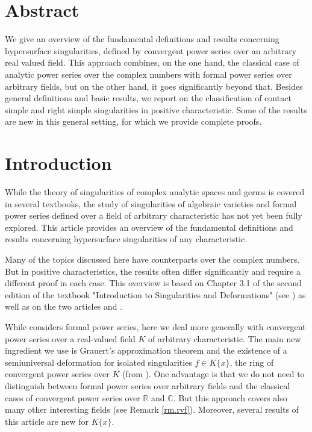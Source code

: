 \documentclass[11pt]{article}
\newcommand{\R}{{\mathbb R}}
\newcommand{\C}{{\mathbb C}}
\begin{document}
\maketitle

\section*{Abstract}
 {We give an overview of the fundamental definitions and results concerning hypersurface singularities, defined by convergent power series over an arbitrary real valued field. This approach combines, on the one hand, the classical case of analytic power series over the complex numbers with formal power series over arbitrary fields, but on the other hand, it goes significantly beyond that.  
Besides  general definitions and  basic results, we report on the classification of contact simple and right simple singularities in positive characteristic. 
Some of the results are new in this general setting, for which we provide complete proofs.}


\tableofcontents


\section*{Introduction}
While the theory of singularities of complex analytic spaces and germs  is covered in several textbooks, the study of singularities of algebraic varieties and formal power series defined over a field of arbitrary characteristic has not yet been fully explored. 
This article provides an overview of the fundamental definitions and results concerning hypersurface singularities of any characteristic.

Many of the topics discussed here have counterparts over the complex numbers. But in positive characteristics, the results often differ significantly and require a different proof in each case. This overview is based on Chapter 3.1 of the second edition of the textbook "Introduction to Singularities and Deformations" (see  \cite{GLS25}) as well as on the two articles \cite{GP25} and \cite{GP25a}.

 
While \cite{GLS25} considers formal power series, here we deal more generally with convergent power series over a real-valued field $K$ of arbitrary characteristic. The main new ingredient we use is Grauert's approximation theorem and the existence of a semiuniversal deformation for isolated singularities $f \in K\{x\}$, the ring of convergent power series over $K$ (from \cite{GP25a}).
One advantage is that we do not need to distinguish between formal power series over arbitrary fields and the classical cases of convergent power series over $\R$ and $\C$. But this approach covers also many other interesting fields (see Remark \ref{rm.rvf}). Moreover, several results of this article are new for $K\{x\}$.\\
\end{document}
